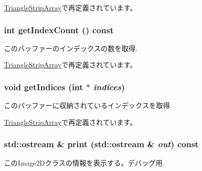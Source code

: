 \hyperlink{classm3g_1_1TriangleStripArray_1623fbdfe91eb2e9d4a67bece6a46904}{TriangleStripArray}で再定義されています。\hypertarget{classm3g_1_1IndexBuffer_fe9ae2993ebcdb93d5ff26d57c81b73e}{
\subsubsection[{getIndexCount}]{\setlength{\rightskip}{0pt plus 5cm}int getIndexCount () const}}
\label{classm3g_1_1IndexBuffer_fe9ae2993ebcdb93d5ff26d57c81b73e}


このバッファーのインデックスの数を取得. 

\hyperlink{classm3g_1_1TriangleStripArray_fe9ae2993ebcdb93d5ff26d57c81b73e}{TriangleStripArray}で再定義されています。\hypertarget{classm3g_1_1IndexBuffer_650953afac45099025a524ab160b911f}{
\subsubsection[{getIndices}]{\setlength{\rightskip}{0pt plus 5cm}void getIndices (int $\ast$ {\em indices})}}
\label{classm3g_1_1IndexBuffer_650953afac45099025a524ab160b911f}


このバッファーに収納されているインデックスを取得. 

\hyperlink{classm3g_1_1TriangleStripArray_650953afac45099025a524ab160b911f}{TriangleStripArray}で再定義されています。\hypertarget{classm3g_1_1IndexBuffer_6fea17fa1532df3794f8cb39cb4f911f}{
\subsubsection[{print}]{\setlength{\rightskip}{0pt plus 5cm}std::ostream \& print (std::ostream \& {\em out}) const}}
\label{classm3g_1_1IndexBuffer_6fea17fa1532df3794f8cb39cb4f911f}


このImage2Dクラスの情報を表示する。デバッグ用. 

